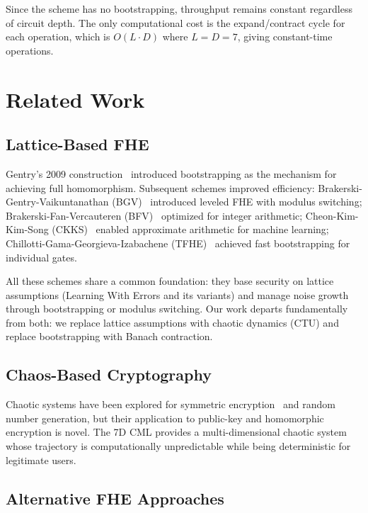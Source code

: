 \documentclass[11pt,a4paper]{article}
\begin{document}
Since the scheme has no bootstrapping, throughput remains constant regardless of circuit depth. The only computational cost is the expand/contract cycle for each operation, which is $O(L \cdot D)$ where $L = D = 7$, giving constant-time operations.

\section{Related Work}
\label{sec:related}

\subsection{Lattice-Based FHE}

Gentry's 2009 construction~\cite{gentry2009} introduced bootstrapping as the mechanism for achieving full homomorphism. Subsequent schemes improved efficiency: Brakerski-Gentry-Vaikuntanathan (BGV)~\cite{brakerski2014} introduced leveled FHE with modulus switching; Brakerski-Fan-Vercauteren (BFV)~\cite{fan2012} optimized for integer arithmetic; Cheon-Kim-Kim-Song (CKKS)~\cite{cheon2017} enabled approximate arithmetic for machine learning; Chillotti-Gama-Georgieva-Izabachene (TFHE)~\cite{chillotti2020} achieved fast bootstrapping for individual gates.

All these schemes share a common foundation: they base security on lattice assumptions (Learning With Errors and its variants) and manage noise growth through bootstrapping or modulus switching. Our work departs fundamentally from both: we replace lattice assumptions with chaotic dynamics (CTU) and replace bootstrapping with Banach contraction.

\subsection{Chaos-Based Cryptography}

Chaotic systems have been explored for symmetric encryption~\cite{strogatz2018} and random number generation, but their application to public-key and homomorphic encryption is novel. The 7D CML provides a multi-dimensional chaotic system whose trajectory is computationally unpredictable while being deterministic for legitimate users.

\subsection{Alternative FHE Approaches}
\end{document}
